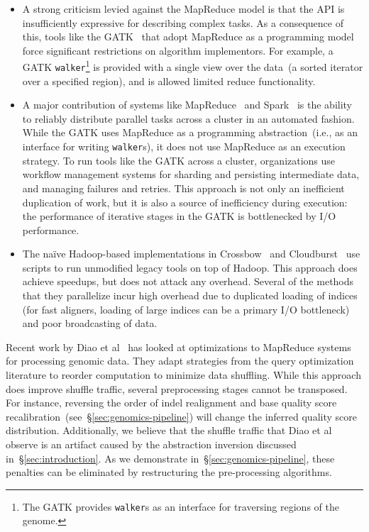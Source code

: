 \documentclass{acm_proc_article-sp}
\begin{document}
\begin{itemize}
\item A strong criticism levied against the MapReduce model is that the API is insufficiently expressive
for describing complex tasks. As a consequence of this, tools like the GATK~\cite{mckenna10} that
adopt MapReduce as a programming model force significant restrictions on algorithm implementors. For
example, a GATK \texttt{walker}\footnote{The GATK provides \texttt{walker}s as an interface for
traversing regions of the genome.} is provided with a single view over the data~(a sorted iterator over a
specified region), and is allowed limited reduce functionality.
\item A major contribution of systems like MapReduce~\cite{dean08} and Spark~\cite{zaharia10,
zaharia12} is the ability to reliably distribute parallel tasks across a cluster in an automated fashion. While
the GATK uses MapReduce as a programming abstraction~(i.e., as an interface for writing
\texttt{walker}s), it does not use MapReduce as an execution strategy. To run tools like the GATK across
a cluster, organizations use workflow management systems for sharding and persisting intermediate
data, and managing failures and retries. This approach is not only an inefficient duplication of work, but it is also a
source of inefficiency during execution: the performance of iterative stages in the GATK is bottlenecked
by I/O performance.
\item The na\"{i}ve Hadoop-based implementations in Crossbow~\cite{langmead09} and
Cloudburst~\cite{schatz09} use scripts to run unmodified legacy tools on top of Hadoop. This approach does
achieve speedups, but does not attack any overhead. Several of the methods that they parallelize incur
high overhead due to duplicated loading of indices (for fast aligners, loading of large indices can be a
primary I/O bottleneck) and poor broadcasting of data.
\end{itemize}

Recent work by Diao et al~\cite{diao15} has looked at optimizations to MapReduce systems for
processing genomic data. They adapt strategies from the query optimization literature to reorder
computation to minimize data shuffling. While this approach does improve shuffle traffic, several
preprocessing stages cannot be transposed. For instance, reversing the order of indel realignment and
base quality score recalibration~(see~\S\ref{sec:genomics-pipeline}) will change the inferred quality
score distribution. Additionally, we believe that the shuffle traffic that Diao et al observe is an artifact
caused by the abstraction inversion discussed in~\S\ref{sec:introduction}. As we demonstrate
in~\S\ref{sec:genomics-pipeline}, these penalties can be eliminated by restructuring the pre-processing
algorithms.
\end{document}
